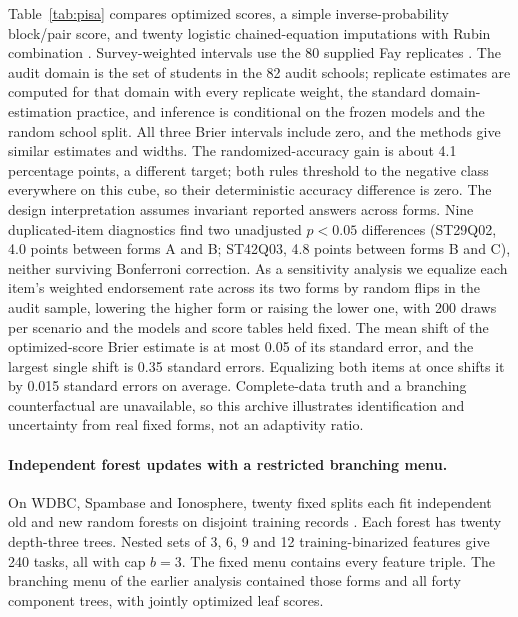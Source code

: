 Table~\ref{tab:pisa} compares optimized scores, a simple inverse-probability block/pair score, and twenty logistic chained-equation imputations with Rubin combination \citep{vanbuuren2011}. Survey-weighted intervals use the 80 supplied Fay replicates \citep{kastberg2014}. The audit domain is the set of students in the 82 audit schools; replicate estimates are computed for that domain with every replicate weight, the standard domain-estimation practice, and inference is conditional on the frozen models and the random school split. All three Brier intervals include zero, and the methods give similar estimates and widths. The randomized-accuracy gain is about 4.1 percentage points, a different target; both rules threshold to the negative class everywhere on this cube, so their deterministic accuracy difference is zero. The design interpretation assumes invariant reported answers across forms. Nine duplicated-item diagnostics find two unadjusted $p<0.05$ differences (ST29Q02, 4.0 points between forms A and B; ST42Q03, 4.8 points between forms B and C), neither surviving Bonferroni correction. As a sensitivity analysis we equalize each item's weighted endorsement rate across its two forms by random flips in the audit sample, lowering the higher form or raising the lower one, with 200 draws per scenario and the models and score tables held fixed. The mean shift of the optimized-score Brier estimate is at most 0.05 of its standard error, and the largest single shift is 0.35 standard errors. Equalizing both items at once shifts it by 0.015 standard errors on average. Complete-data truth and a branching counterfactual are unavailable, so this archive illustrates identification and uncertainty from real fixed forms, not an adaptivity ratio.

\paragraph{Independent forest updates with a restricted branching menu.}
On WDBC, Spambase and Ionosphere, twenty fixed splits each fit independent old and new random forests on disjoint training records \citep{wolberg1993,spambase1999,ionosphere1989}. Each forest has twenty depth-three trees. Nested sets of 3, 6, 9 and 12 training-binarized features give 240 tasks, all with cap $b=3$. The fixed menu contains every feature triple. The branching menu of the earlier analysis contained those forms and all forty component trees, with jointly optimized leaf scores.



